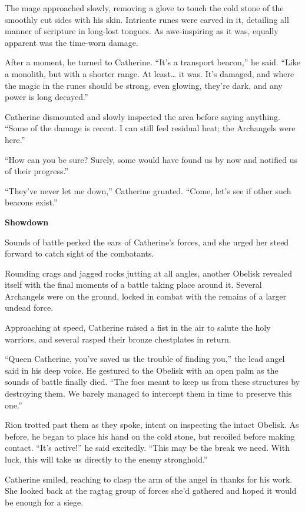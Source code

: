 \begin{multicols*}{2}
The mage approached slowly, removing a glove to touch the cold stone of the smoothly cut sides with his skin.
Intricate runes were carved in it, detailing all manner of scripture in long-lost tongues.
As awe-inspiring as it was, equally apparent was the time-worn damage.

After a moment, he turned to Catherine.
``It's a transport beacon,'' he said.
``Like a monolith, but with a shorter range.
At least… it was.
It's damaged, and where the magic in the runes should be strong, even glowing, they're dark, and any power is long decayed.''

Catherine dismounted and slowly inspected the area before saying anything.
``Some of the damage is recent.
I can still feel residual heat; the Archangels were here.''

``How can you be sure? Surely, some would have found us by now and notified us of their progress.''

``They've never let me down,'' Catherine grunted.
``Come, let's see if other such beacons exist.''

\textbf{Showdown}

Sounds of battle perked the ears of Catherine's forces, and she urged her steed forward to catch sight of the combatants.

Rounding crags and jagged rocks jutting at all angles, another Obelisk revealed itself with the final moments of a battle taking place around it.
Several Archangels were on the ground, locked in combat with the remains of a larger undead force.

Approaching at speed, Catherine raised a fist in the air to salute the holy warriors, and several rasped their bronze chestplates in return.

``Queen Catherine, you've saved us the trouble of finding you,'' the lead angel said in his deep voice.
He gestured to the Obelisk with an open palm as the sounds of battle finally died.
``The foes meant to keep us from these structures by destroying them.
We barely managed to intercept them in time to preserve this one.''

Rion trotted past them as they spoke, intent on inspecting the intact Obelisk.
As before, he began to place his hand on the cold stone, but recoiled before making contact.
``It's active!'' he said excitedly.
``This may be the break we need.
With luck, this will take us directly to the enemy stronghold.''

Catherine smiled, reaching to clasp the arm of the angel in thanks for his work.
She looked back at the ragtag group of forces she'd gathered and hoped it would be enough for a siege.


\end{multicols*}
